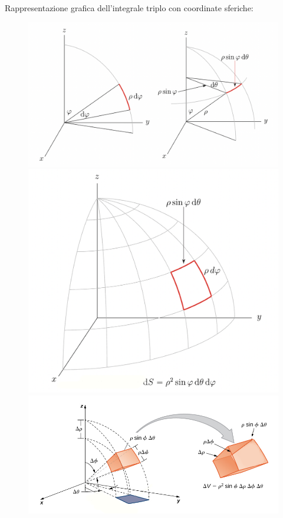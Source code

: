 \documentclass[a4paper]{article}
\begin{document}
	\noindent
	Rappresentazione grafica dell'integrale triplo con coordinate sferiche:
	\begin{figure}[!htp]
		\centering
		\includegraphics[width=\textwidth]{img/integrali_tripli-coordinate_sferiche_1.png}
		\includegraphics[width=.6\textwidth]{img/integrali_tripli-coordinate_sferiche_2.png}
		\includegraphics[width=\textwidth]{img/integrali_tripli-coordinate_sferiche_3.png}
	\end{figure}\newpage
\end{document}
